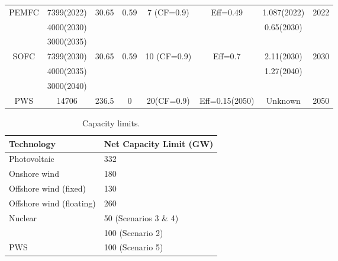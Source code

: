 \begin{landscape}
\begin{longtable}{ |*{8}{c|} }
\gls{PEMFC} \cite{iea_technology_2015,simons_life-cycle_2015,kannan_life_2007} & 7399(2022) & 30.65 & 0.59 & 7 (CF=0.9) & Eff=0.49 & 1.087(2022) & 2022\\
 & 4000(2030) &  &  &  &  & 0.65(2030) &  \\
 & 3000(2035) &  &  &  &  &  &  \\
\gls{SOFC} \cite{iea_technology_2015,simons_life-cycle_2015,rillo_life_2017,tu_advances_2004} & 7399(2030) & 30.65 & 0.59 & 10 (CF=0.9) & Eff=0.7 & 2.11(2030) & 2030\\
 & 4000(2035) &  &  &  &  & 1.27(2040) &  \\
 & 3000(2040) &  &  &  &  & &  \\
\gls{PWS} \cite{pinaud_technical_2013} & 14706  & 236.5 & 0 & 20(CF=0.9) & Eff=0.15(2050) & Unknown & 2050
\label{eco}
\end{longtable}
\end{landscape}



\begin{table}[!ht]
	\caption{Capacity limits.}
	\vspace{0.1in}
	\begin{tabularx}{\textwidth}{p{} p{} }
		\hline
\textbf{Technology} & \textbf{Net Capacity} \textbf{Limit} (GW)\\
\hline
Photovoltaic \cite{isep_53_2018} & 332 \\
Onshore wind \cite{heger_wind_2016,kato_energy_2016} & 180 \\
Offshore wind (fixed) \cite{heger_wind_2016,kato_energy_2016}& 130 \\
Offshore wind (floating) \cite{heger_wind_2016,kato_energy_2016}& 260 \\
Nuclear & 50 (Scenarios 3 \& 4) \\
 & 100 (Scenario 2) \\
\gls{PWS} \cite{pinaud_technical_2013} & 100 (Scenario 5) \\
\hline 
\end{tabularx}
\label{caplim}
\end{table}


